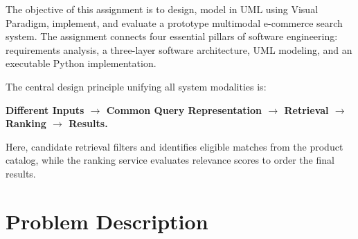 \documentclass[12pt,a4paper]{article}
\begin{document}
The objective of this assignment is to design, model in UML using Visual Paradigm, implement, and evaluate a prototype multimodal e-commerce search system. The assignment connects four essential pillars of software engineering: requirements analysis, a three-layer software architecture, UML modeling, and an executable Python implementation.

The central design principle unifying all system modalities is:
\begin{center}
\textbf{Different Inputs $\longrightarrow$ Common Query Representation $\longrightarrow$ Retrieval $\longrightarrow$ Ranking $\longrightarrow$ Results.}
\end{center}
Here, candidate retrieval filters and identifies eligible matches from the product catalog, while the ranking service evaluates relevance scores to order the final results. 


\FloatBarrier
\section{Problem Description}\label{sec:problem}
\end{document}
